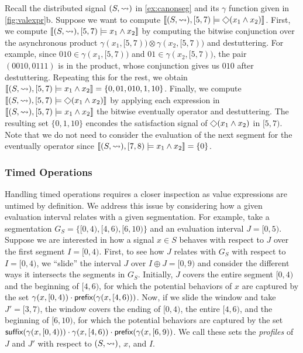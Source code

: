 \begin{example}
	Recall the distributed signal $(S, {\rightsquigarrow})$ in \cref{ex:canonseg} and its $\gamma$ function given in \cref{fig:valexpr}b.
	Suppose we want to compute $\llbracket (S, {\hb}), [5,7) \models \LTLeventually(x_1 \land x_2) \rrbracket$.
	First, we compute $\llbracket (S, {\rightsquigarrow}), [5,7) \models x_1 \land x_2 \rrbracket$ by computing the bitwise conjunction over the asynchronous product $\gamma(x_1, [5,7)) \otimes \gamma(x_2, [5,7))$ and destuttering.
	For example, since $010 \in \gamma(x_1, [5,7))$ and $01 \in \gamma(x_2, [5,7))$, the pair $(0010,0111)$ is in the product, whose conjunction gives us $010$ after destuttering. 
	Repeating this for the rest, we obtain $\llbracket (S, {\rightsquigarrow}), [5,7) \models x_1 \land x_2 \rrbracket = \{ 0, 01, 010, 1, 10 \}$.
	Finally, we compute $\llbracket (S, {\hb}), [5,7) \models \LTLeventually(x_1 \land x_2) \rrbracket$ by applying each expression in $\llbracket (S, {\rightsquigarrow}), [5,7) \models x_1 \land x_2 \rrbracket$ the bitwise eventually operator and destuttering.
	The resulting set $\{0, 1, 10\}$ encondes the satisfaction signal of $\LTLeventually(x_1 \land x_2)$ in $[5,7)$.
	Note that we do not need to consider the evaluation of the next segment for the eventually operator since $\llbracket (S, {\rightsquigarrow}), [7,8) \models x_1 \land x_2 \rrbracket = \{0\}$.
\end{example}

\subsubsection{Timed Operations}
Handling timed operations requires a closer inspection as value expressions are untimed by definition.
We address this issue by considering how a given evaluation interval relates with a given segmentation.
For example, take a segmentation $G_S = \{ [0,4), [4,6), [6,10) \}$ and an evaluation interval $J = [0,5)$.
Suppose we are interested in how a signal $x \in S$ behaves with respect to $J$ over the first segment $I = [0,4)$.
First, to see how $J$ relates with $G_S$ with respect to $I =[0,4)$, we  ``slide'' the interval $J$ over $I \oplus J = [0,9)$ and consider the different ways it intersects the segments in $G_S$.
Initially, $J$ covers the entire segment $[0,4)$ and the beginning of $[4,6)$, for which the potential behaviors of $x$ are captured by the set $\gamma(x, [0,4)) \cdot \textsf{prefix}(\gamma(x, [4,6)))$.
Now, if we slide the window and take $J' = [3,7)$, the window covers the ending of $[0,4)$, the entire $[4,6)$, and the beginning of $[6,10)$, for which the potential behaviors are captured by the set $\textsf{suffix}(\gamma(x, [0,4))) \cdot \gamma(x, [4,6)) \cdot \textsf{prefix}(\gamma(x, [6,9))$.
We call these sets the \emph{profiles} of $J$ and $J'$ with respect to $(S,{\rightsquigarrow})$, $x$, and $I$.

